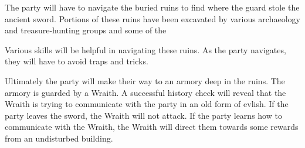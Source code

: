 The party will have to navigate the buried ruins to find where the guard stole the ancient sword.
Portions of these ruins have been excavated by various archaeology and treasure-hunting groups and some of the 

Various skills will be helpful in navigating these ruins.
As the party navigates, they will have to avoid traps and tricks.

Ultimately the party will make their way to an armory deep in the ruins.
The armory is guarded by a Wraith.
A successful history check will reveal that the Wraith is trying to communicate with the party in an old form of evlish.
If the party leaves the sword, the Wraith will not attack.
If the party learns how to communicate with the Wraith, the Wraith will direct them towards some rewards from an undisturbed building.
